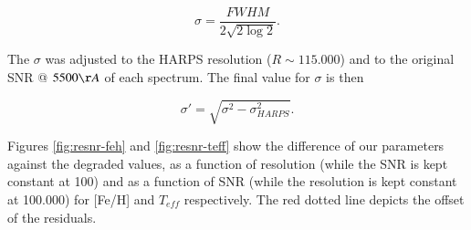 \documentclass[referee]{aa}
\begin{document}
\begin{equation}
\label{eq:fwhm}
\sigma = \frac{FWHM}{2\sqrt{2\log{2}}}. 
\end{equation}

The $\sigma$ was adjusted to the HARPS resolution ($R\sim115.000$) and to the original SNR @ $5500 \AA$  of each spectrum. The final value for $\sigma$ is then





\begin{equation}
\sigma' = \sqrt{\sigma^2-\sigma_{HARPS}^2}.
\end{equation}

Figures \ref{fig:resnr-feh} and \ref{fig:resnr-teff} show the difference of our parameters against the degraded values, as a function of resolution (while the SNR is kept constant at 100) and as a function of SNR (while the resolution is kept constant at 100.000) for [Fe/H] and $T_{eff}$ respectively. The red dotted line depicts the offset of the residuals. 



\end{document}
